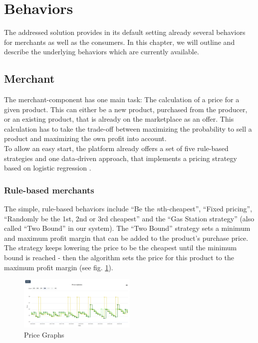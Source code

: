 \section{Behaviors}
\label{sec:Behaviors}
%
The addressed solution provides in its default setting already several behaviors for merchants as well as the consumers. In this chapter, we will outline and describe the underlying behaviors which are currently available.

\subsection{Merchant}
\label{sec:Behaviors_Merchants}
%
The merchant-component has one main task: The calculation of a price for a given product. This can either be a new product, purchased from the producer, or an existing product, that is already on the marketplace as an offer. This calculation has to take the trade-off between maximizing the probability to sell a product and maximizing the own profit into account. \\

To allow an easy start, the platform already offers a set of five rule-based strategies and one data-driven approach, that implements a pricing strategy based on logistic regression \citep{hosmer2013applied}.

%
\subsubsection{Rule-based merchants}
%
The simple, rule-based behaviors include ``Be the \textit{n}th-cheapest'', ``Fixed pricing'', ``Randomly be the 1st, 2nd or 3rd cheapest'' and the ``Gas Station strategy'' (also called ``Two Bound'' in our system). The ``Two Bound'' strategy sets a minimum and maximum profit margin that can be added to the product's purchase price. The strategy keeps lowering the price to be the cheapest until the minimum bound is reached - then the algorithm sets the price for this product to the maximum profit margin (see fig. \ref{fig:price_graphs_v2}). \\

%
\begin{figure}[h]
    \centering
    \includegraphics[width=0.5\textwidth]{images/price_graphs_v2.png}
    \caption{Price Graphs}
    \label{fig:price_graphs_v2}
\end{figure}
%

